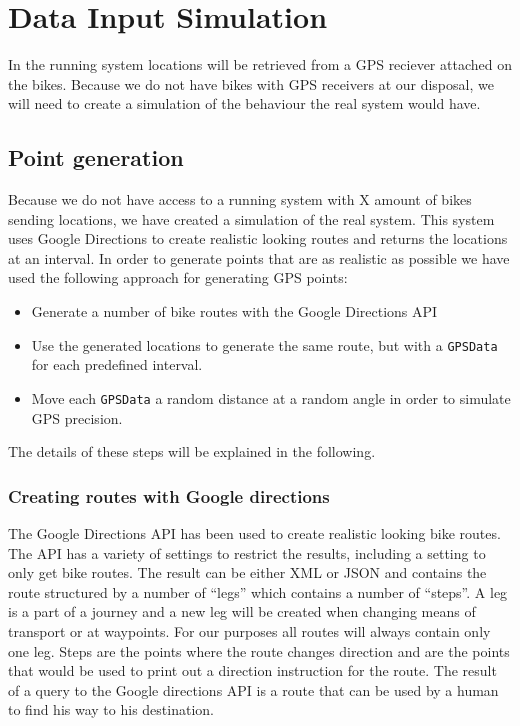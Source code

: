 \section{Data Input Simulation}\label{design:datasimulation}
In the running system locations will be retrieved from a GPS reciever attached on the bikes.
Because we do not have bikes with GPS receivers at our disposal, we will need to create a simulation of the behaviour the real system would have.

\subsection{Point generation}
Because we do not have access to a running system with X amount of bikes sending locations, we have created a simulation of the real system.
This system uses Google Directions to create realistic looking routes and returns the locations at an interval.
In order to generate points that are as realistic as possible we have used the following approach for generating GPS points:

\begin{itemize}
\item Generate a number of bike routes with the Google Directions API
\item Use the generated locations to generate the same route, but with a \texttt{GPSData} for each predefined interval.
\item Move each \texttt{GPSData} a random distance at a random angle in order to simulate GPS precision.
\end{itemize}

The details of these steps will be explained in the following.

\subsubsection{Creating routes with Google directions}

The Google Directions API \cite{gdirections} has been used to create realistic looking bike routes.
The API has a variety of settings to restrict the results, including a setting to only get bike routes.
The result can be either XML or JSON and contains the route structured by a number of  ``legs'' which contains a number of ``steps''.
A leg is a part of a journey and a new leg will be created when changing means of transport or at waypoints.
For our purposes all routes will always contain only one leg.
Steps are the points where the route changes direction and are the points that would be used to print out a direction instruction for the route.
The result of a query to the Google directions API is a route that can be used by a human to find his way to his destination.

